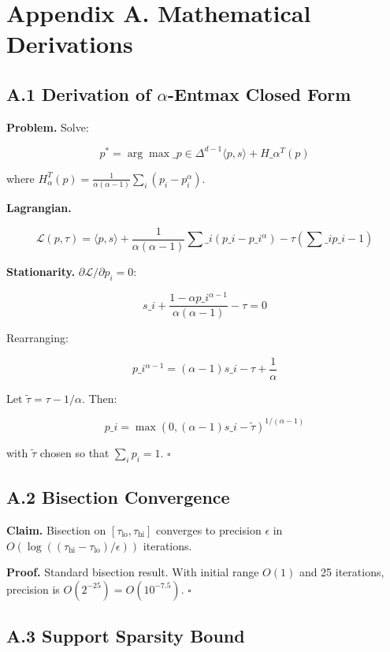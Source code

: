 
\section{Appendix A. Mathematical Derivations}

\subsection{A.1 Derivation of $\alpha$-Entmax Closed Form}

\textbf{Problem.} Solve:

\[
p^* = \arg\max\_{p \in \Delta^{d-1}} \langle p, s \rangle + H\_\alpha^T(p)
\tag{A.1}
\]

where $H_\alpha^T(p) = \frac{1}{\alpha(\alpha-1)} \sum_i (p_i - p_i^\alpha)$.

\textbf{Lagrangian.}

\[
\mathcal{L}(p, \tau) = \langle p, s \rangle + \frac{1}{\alpha(\alpha-1)} \sum\_i (p\_i - p\_i^\alpha) - \tau \left(\sum\_i p\_i - 1\right)
\tag{A.2}
\]

\textbf{Stationarity.} $\partial \mathcal{L} / \partial p_i = 0$:

\[
s\_i + \frac{1 - \alpha p\_i^{\alpha-1}}{\alpha(\alpha-1)} - \tau = 0
\tag{A.3}
\]

Rearranging:

\[
p\_i^{\alpha - 1} = (\alpha - 1) s\_i - \tau + \frac{1}{\alpha}
\tag{A.4}
\]

Let $\tilde\tau = \tau - 1/\alpha$. Then:

\[
p\_i = \max\left(0, (\alpha - 1) s\_i - \tilde\tau\right)^{1/(\alpha - 1)}
\tag{A.5}
\]

with $\tilde\tau$ chosen so that $\sum_i p_i = 1$. $\square$

\subsection{A.2 Bisection Convergence}

\textbf{Claim.} Bisection on $[\tau_\text{lo}, \tau_\text{hi}]$ converges to 
precision $\epsilon$ in $O(\log((\tau_\text{hi} - \tau_\text{lo})/\epsilon))$ 
iterations.

\textbf{Proof.} Standard bisection result. With initial range $O(1)$ and 25 
iterations, precision is $O(2^{-25}) = O(10^{-7.5})$. $\square$

\subsection{A.3 Support Sparsity Bound}


